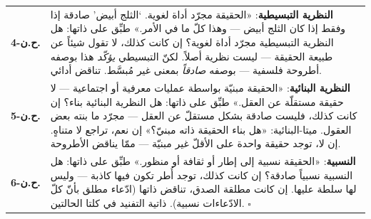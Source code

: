 \documentclass[10pt, openany, oneside]{book}
\renewcommand{\footnotesize}{\fontsize{8.5}{11}\selectfont}
\begin{document}
\vspace{0.5em}

{\footnotesize
\noindent\begin{tabular}{r p{}}
\textbf{ح.ن-4.} & \textbf{النظرية التبسيطية}: «الحقيقة مجرّد أداة لغوية. `الثلج أبيض' صادقة إذا وفقط إذا كان الثلج أبيض --- وهذا كلّ ما في الأمر.» طبِّق على ذاتها: هل النظرية التبسيطية مجرّد أداة لغوية؟ إن كانت كذلك، لا تقول شيئاً عن طبيعة الحقيقة --- ليست نظرية أصلاً. لكنّ التبسيطي \textit{يؤكّد} هذا بوصفه أطروحة فلسفية --- بوصفه \textit{صادقاً} بمعنى غير مُبسَّط. تناقض أدائي. \\[0.5em]
\textbf{ح.ن-5.} & \textbf{النظرية البنائية}: «الحقيقة مبنيّة بواسطة عمليات معرفية أو اجتماعية --- لا حقيقة مستقلّة عن العقل.» طبِّق على ذاتها: هل النظرية البنائية بناء؟ إن كانت كذلك، فليست صادقة بشكل مستقلّ عن العقل --- مجرّد ما بنته بعض العقول. ميتا-البنائية: «هل بناء الحقيقة ذاته مبنيّ؟» إن نعم، تراجع لا متناهٍ. إن لا، توجد حقيقة واحدة على الأقلّ غير مبنيّة --- ممّا يناقض الأطروحة. \\[0.5em]
\textbf{ح.ن-6.} & \textbf{النسبية}: «الحقيقة نسبية إلى إطار أو ثقافة أو منظور.» طبِّق على ذاتها: هل النسبية نسبياً صادقة؟ إن كانت كذلك، توجد أُطر تكون فيها كاذبة --- وليس لها سلطة عليها. إن كانت مطلقة الصدق، تناقض ذاتها (ادّعاء مطلق بأنّ كلّ الادّعاءات نسبية). ذاتية التفنيد في كلتا الحالتين. $\square$ \\[0.3em]
\end{tabular}
}

\vspace{0.5em}
\end{document}
